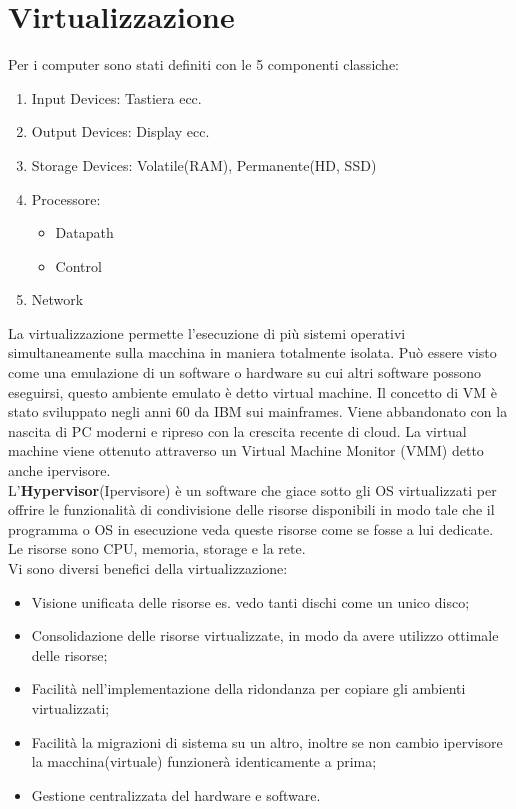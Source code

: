 \documentclass[11pt, twocolumn]{article}
\newenvironment{myitemize}
{ \begin{itemize}[topsep=0ex]
		\setlength{\itemsep}{0pt}
		\setlength{\parskip}{0pt}
		\setlength{\parsep}{0pt}     }
	{ \end{itemize}                  }
\newenvironment{myenumerate}
{ \begin{enumerate}[topsep=0ex]
		\setlength{\itemsep}{0pt}
		\setlength{\parskip}{0pt}
		\setlength{\parsep}{0pt}     }
	{ \end{enumerate}                  }
\begin{document}
\section{Virtualizzazione}
Per i computer sono stati definiti con le 5 componenti classiche:
\begin{myenumerate}
	\item Input Devices: Tastiera ecc.
	\item Output Devices: Display ecc.
	\item Storage Devices: Volatile(RAM), Permanente(HD, SSD)
	\item Processore:
	\begin{myitemize}
		\item Datapath
		\item Control
	\end{myitemize}
	\item Network
\end{myenumerate}
La virtualizzazione permette l'esecuzione di più sistemi operativi simultaneamente sulla macchina in maniera totalmente isolata. 
Può essere visto come una emulazione di un software o hardware su cui altri software possono eseguirsi, questo ambiente emulato è detto virtual machine.
Il concetto di VM è stato sviluppato negli anni 60 da IBM sui mainframes.
Viene abbandonato con la nascita di PC moderni e ripreso con la crescita recente di cloud. La virtual machine viene ottenuto attraverso un Virtual Machine Monitor (VMM) detto anche ipervisore.\\
L'\textbf{Hypervisor}(Ipervisore) è un software che giace sotto gli OS virtualizzati per offrire le funzionalità di condivisione delle risorse disponibili in modo tale che il programma o OS in esecuzione veda queste risorse come se fosse a lui dedicate. 
Le risorse sono CPU, memoria, storage e la rete.\\
Vi sono diversi benefici della virtualizzazione:
\begin{myitemize}
	\item Visione unificata delle risorse es. vedo tanti dischi come un unico disco;
	\item Consolidazione delle risorse virtualizzate, in modo da avere utilizzo ottimale delle risorse;
	\item Facilità nell'implementazione della ridondanza per copiare gli ambienti virtualizzati;
	\item Facilità la migrazioni di sistema su un altro, inoltre se non cambio ipervisore la macchina(virtuale) funzionerà identicamente a prima;
	\item Gestione centralizzata del hardware e software.
\end{myitemize}
\end{document}
